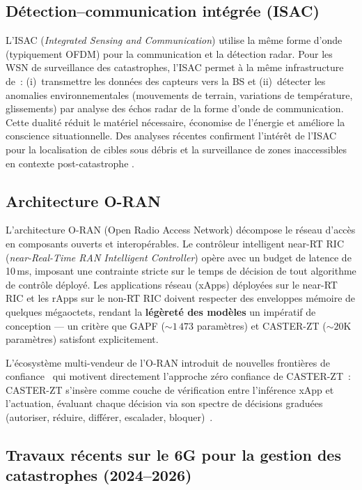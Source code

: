 \subsection{Détection--communication intégrée (ISAC)}

L'ISAC (\emph{Integrated Sensing and Communication}) utilise la même forme d'onde (typiquement OFDM) pour la communication et la détection radar. Pour les WSN de surveillance des catastrophes, l'ISAC permet à la même infrastructure de~: (i)~transmettre les données des capteurs vers la BS et (ii)~détecter les anomalies environnementales (mouvements de terrain, variations de température, glissements) par analyse des échos radar de la forme d'onde de communication. Cette dualité réduit le matériel nécessaire, économise de l'énergie et améliore la conscience situationnelle. Des analyses récentes confirment l'intérêt de l'ISAC pour la localisation de cibles sous débris et la surveillance de zones inaccessibles en contexte post-catastrophe \cite{isac_disaster_lwc2025}.

\subsection{Architecture O-RAN}

L'architecture O-RAN (Open Radio Access Network) décompose le réseau d'accès en composants ouverts et interopérables. Le contrôleur intelligent near-RT RIC (\emph{near-Real-Time RAN Intelligent Controller}) opère avec un budget de latence de 10\,ms, imposant une contrainte stricte sur le temps de décision de tout algorithme de contrôle déployé. Les applications réseau (xApps) déployées sur le near-RT RIC et les rApps sur le non-RT RIC doivent respecter des enveloppes mémoire de quelques mégaoctets, rendant la \textbf{légèreté des modèles} un impératif de conception --- un critère que GAPF (${\sim}1\,473$ paramètres) et CASTER-ZT (${\sim}20$K paramètres) satisfont explicitement.

L'écosystème multi-vendeur de l'O-RAN introduit de nouvelles frontières de confiance~\cite{rose2020nist,oran_survey_acm2024} qui motivent directement l'approche zéro confiance de CASTER-ZT~: CASTER-ZT s'insère comme couche de vérification entre l'inférence xApp et l'actuation, évaluant chaque décision via son spectre de décisions graduées (autoriser, réduire, différer, escalader, bloquer)~\cite{alshiekh2018shielding}.

\subsection{Travaux récents sur le 6G pour la gestion des catastrophes (2024--2026)}

